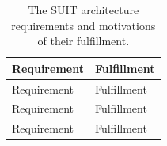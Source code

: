 \documentclass[0-thesis.tex]{subfiles}
\begin{document}
\begin{small}
\begin{longtable}[]{@{}ll@{}}
    \caption{The SUIT architecture requirements and motivations of their fulfillment.}
    \label{tab:architecture-evaluation}\\
    \toprule
    \begin{minipage}[b]{0.41\columnwidth}\raggedright\strut
    Requirement\strut
    \end{minipage} & \begin{minipage}[b]{0.53\columnwidth}\raggedright\strut
    Fulfillment\strut
    \end{minipage}\tabularnewline
    \midrule
    \endfirsthead
    \toprule
    \begin{minipage}[b]{0.41\columnwidth}\raggedright\strut
    Requirement\strut
    \end{minipage} & \begin{minipage}[b]{0.53\columnwidth}\raggedright\strut
    Fulfillment\strut
    \end{minipage}\tabularnewline
    \midrule
    \endhead
    \toprule
    \begin{minipage}[b]{0.41\columnwidth}\raggedright\strut
    Requirement\strut
    \end{minipage} & \begin{minipage}[b]{0.53\columnwidth}\raggedright\strut
    Fulfillment\strut
    \end{minipage}\tabularnewline
    \midrule
    \endhead
    \toprule
    \begin{minipage}[b]{0.41\columnwidth}\raggedright\strut
    Requirement\strut
    \end{minipage} & \begin{minipage}[b]{0.53\columnwidth}\raggedright\strut
    Fulfillment\strut
    \end{minipage}\tabularnewline
    \midrule
    \endhead


\end{longtable}
\end{small}
\end{document}

